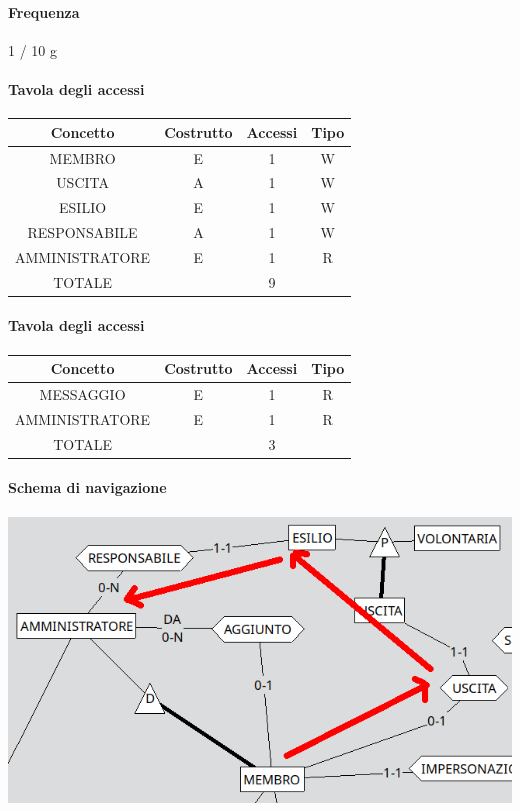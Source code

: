 \documentclass[a4paper,12pt]{report}
\begin{document}
\paragraph{Frequenza} 1 / 10 g
\begin{table}[H]
\paragraph{Tavola degli accessi\newline}
\begin{tabular}{|c|c|c|c|}
\hline
Concetto       & Costrutto & Accessi & Tipo \\ \hline
MEMBRO         & E         & 1       & W    \\ \hline
USCITA         & A         & 1       & W    \\ \hline
ESILIO         & E         & 1       & W    \\ \hline
RESPONSABILE   & A         & 1       & W    \\ \hline
AMMINISTRATORE & E         & 1       & R    \\ \hline
TOTALE         &           & 9       &      \\ \hline
\end{tabular}
\end{table}
\begin{table}[H]
\paragraph{Tavola degli accessi\newline}
\begin{tabular}{|c|c|c|c|}
\hline
Concetto       & Costrutto & Accessi & Tipo \\ \hline
MESSAGGIO      & E         & 1       & R    \\ \hline
AMMINISTRATORE & E         & 1       & R    \\ \hline
TOTALE         &           & 3       &      \\ \hline
\end{tabular}
\end{table}
\paragraph{Schema di navigazione\newline}
\includegraphics[scale=0.5]{./img/esilio.png}
\end{document}
